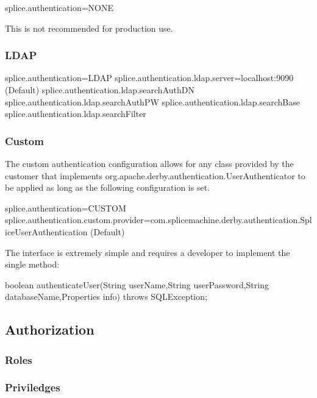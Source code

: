 splice.authentication=NONE

This is not recommended for production use.

\subsubsection{LDAP}

splice.authentication=LDAP
splice.authentication.ldap.server=localhost:9090 (Default)
splice.authentication.ldap.searchAuthDN
splice.authentication.ldap.searchAuthPW
splice.authentication.ldap.searchBase
splice.authentication.ldap.searchFilter

\subsubsection{Custom}

The custom authentication
configuration allows for any
class provided by the customer
that implements org.apache.derby.authentication.UserAuthenticator
to be applied as long as the following configuration is set.

splice.authentication=CUSTOM
splice.authentication.custom.provider=com.splicemachine.derby.authentication.SpliceUserAuthentication
(Default)

The interface is extremely simple and requires a developer to implement the
single method:

boolean	authenticateUser(String userName,String userPassword,String
databaseName,Properties info) throws SQLException;


\subsection{Authorization}

\subsubsection{Roles}

\subsubsection{Priviledges}

